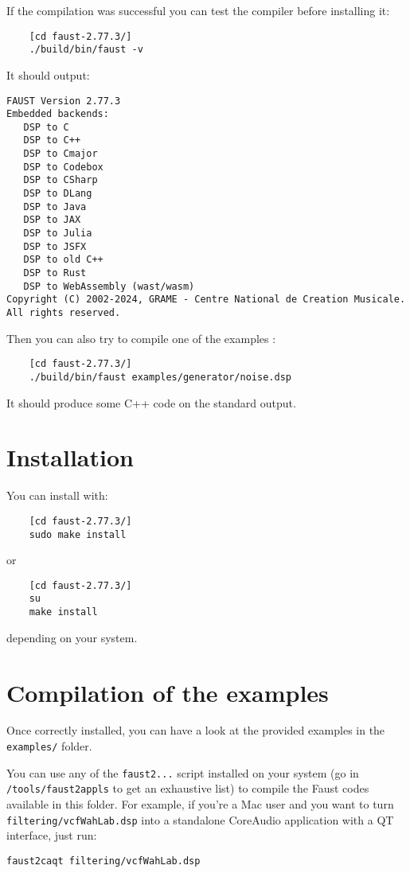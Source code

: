 If the compilation was successful you can test the compiler before installing it:
\begin{lstlisting}
	[cd faust-2.77.3/]
	./build/bin/faust -v
\end{lstlisting}
It should output:
\begin{lstlisting}
FAUST Version 2.77.3
Embedded backends: 
   DSP to C
   DSP to C++
   DSP to Cmajor
   DSP to Codebox
   DSP to CSharp
   DSP to DLang
   DSP to Java
   DSP to JAX
   DSP to Julia
   DSP to JSFX
   DSP to old C++
   DSP to Rust
   DSP to WebAssembly (wast/wasm)
Copyright (C) 2002-2024, GRAME - Centre National de Creation Musicale. All rights reserved. 
\end{lstlisting}

Then you can also try to compile one of the examples :
\begin{lstlisting}
	[cd faust-2.77.3/]
	./build/bin/faust examples/generator/noise.dsp
\end{lstlisting}
It should produce some C++ code on the standard output.

\section{Installation}
You can install \faust with:
\begin{lstlisting}
	[cd faust-2.77.3/]
	sudo make install
\end{lstlisting}
or
\begin{lstlisting}
	[cd faust-2.77.3/]
	su
	make install
\end{lstlisting}
depending on your system.

\section{Compilation of the examples}

Once \faust correctly installed, you can have a look at the provided examples in the \lstinline'examples/' folder. 

You can use any of the \lstinline'faust2...' script installed on your system (go in \lstinline'/tools/faust2appls' to get an exhaustive list) to compile the Faust codes available in this folder. For example, if you're a Mac user and you want to turn \lstinline'filtering/vcfWahLab.dsp' into a standalone CoreAudio application with a QT interface, just run:

\lstinline'faust2caqt filtering/vcfWahLab.dsp'

